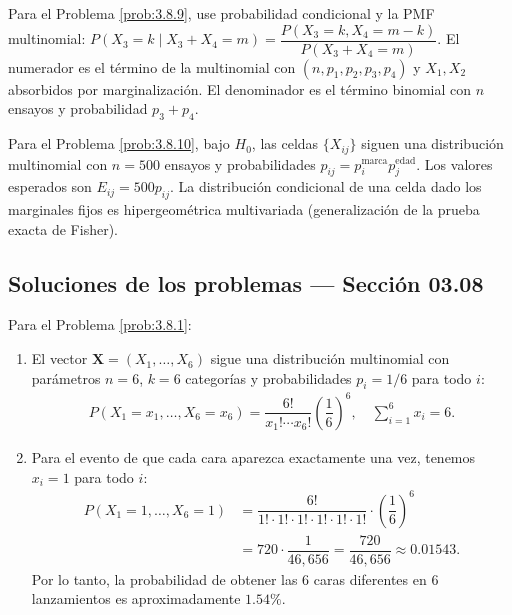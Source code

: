 \begin{sugerencia}
	\label{sug:3.8.9}
	Para el Problema \ref{prob:3.8.9}, use probabilidad condicional y la PMF multinomial: $P(X_{3} = k \mid X_{3} + X_{4} = m) = \dfrac{P(X_{3} = k, X_{4} = m-k)}{P(X_{3} + X_{4} = m)}$. El numerador es el término de la multinomial con $(n, p_{1}, p_{2}, p_{3}, p_{4})$ y $X_{1}, X_{2}$ absorbidos por marginalización. El denominador es el término binomial con $n$ ensayos y probabilidad $p_{3} + p_{4}$.
\end{sugerencia}

\begin{sugerencia}
	\label{sug:3.8.10}
	Para el Problema \ref{prob:3.8.10}, bajo $H_{0}$, las celdas $\{X_{ij}\}$ siguen una distribución multinomial con $n = 500$ ensayos y probabilidades $p_{ij} = p_{i}^{\text{marca}} p_{j}^{\text{edad}}$. Los valores esperados son $E_{ij} = 500 p_{ij}$. La distribución condicional de una celda dado los marginales fijos es hipergeométrica multivariada (generalización de la prueba exacta de Fisher).
\end{sugerencia}

\subsection*{Soluciones de los problemas --- Sección 03.08}

\begin{solucion}
	\label{sol:3.8.1}
	Para el Problema \ref{prob:3.8.1}:
	\begin{enumerate}
		\item El vector $\bm{X} = (X_{1}, \dots, X_{6})$ sigue una distribución multinomial con parámetros $n = 6$, $k = 6$ categorías y probabilidades $p_{i} = 1/6$ para todo $i$:
		\begin{align*}
			P(X_{1} = x_{1}, \dots, X_{6} = x_{6}) = \dfrac{6!}{x_{1}! \cdots x_{6}!} \left(\dfrac{1}{6}\right)^{6}, \quad \sum_{i=1}^{6} x_{i} = 6.
		\end{align*}
		\item Para el evento de que cada cara aparezca exactamente una vez, tenemos $x_{i} = 1$ para todo $i$:
		\begin{align*}
			P(X_{1} = 1, \dots, X_{6} = 1) &= \dfrac{6!}{1! \cdot 1! \cdot 1! \cdot 1! \cdot 1! \cdot 1!} \cdot \left(\dfrac{1}{6}\right)^{6} \\
			&= 720 \cdot \dfrac{1}{46{,}656} = \dfrac{720}{46{,}656} \approx 0.01543.
		\end{align*}
		Por lo tanto, la probabilidad de obtener las 6 caras diferentes en 6 lanzamientos es aproximadamente $1.54\%$.
	\end{enumerate}
\end{solucion}

